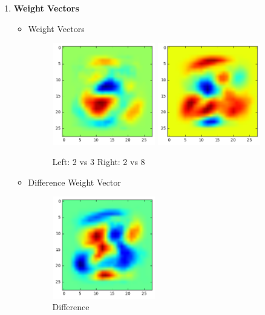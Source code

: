 \documentclass[11pt,twoside]{article}
\begin{document}
\begin{enumerate}[label=(\alph*)]
\begin{itemize}
\end{itemize}

\item \textbf{Weight Vectors}

\begin{itemize}

  \item Weight Vectors
  \begin{figure}[H]
  \includegraphics[width=0.45\textwidth]{2vs3_weight}
  \includegraphics[width=0.45\textwidth]{2vs8_weight}
  \centering
  \caption{Left: 2 vs 3 Right: 2 vs 8}
  \label{fig:4_2}
  \end{figure}
  
  \item Difference Weight Vector
  \begin{figure}[H]
  \includegraphics[width=0.45\textwidth]{diff_weight}
  \centering
  \caption{Difference}
  \label{fig:4_2}
  \end{figure}
  

\end{itemize}
\end{enumerate}
\end{document}
